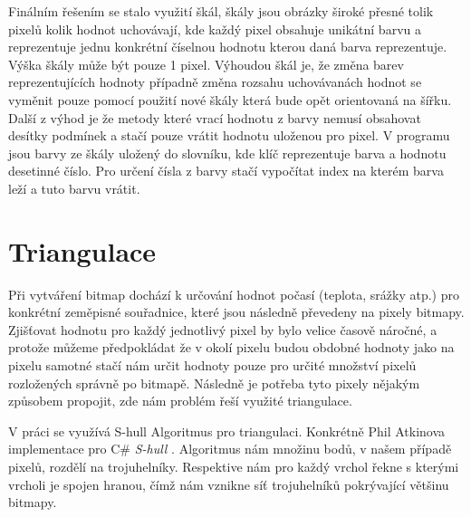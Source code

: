 \documentclass[czech,bachelor,dept460,male,csharp,cpdeclaration]{diploma}
\begin{document}
	Finálním řešením se stalo využití škál, škály jsou obrázky široké přesné tolik pixelů kolik hodnot uchovávají, kde každý pixel obsahuje unikátní barvu a reprezentuje jednu konkrétní číselnou hodnotu kterou daná barva reprezentuje. Výška škály může být pouze 1 pixel. Výhoudou škál je, že změna barev reprezentujících hodnoty případně změna rozsahu uchovávanách hodnot se vyměnit pouze pomocí použití nové škály která bude opět orientovaná na šířku. Další z výhod je že metody které vrací hodnotu z barvy nemusí obsahovat desítky podmínek a stačí pouze vrátit hodnotu uloženou pro pixel. V programu jsou barvy ze škály uložený do slovníku, kde klíč reprezentuje barva a hodnotu desetinné číslo. Pro určení čísla z barvy stačí vypočítat index na kterém barva leží a tuto barvu vrátit.
	
	\section{Triangulace}
	
	Při vytváření bitmap dochází k určování hodnot počasí (teplota, srážky atp.) pro konkrétní zeměpisné souřadnice, které jsou následně převedeny na pixely bitmapy. Zjišťovat hodnotu pro každý jednotlivý pixel by bylo velice časově náročné, a protože můžeme předpokládat že v okolí pixelu budou obdobné hodnoty jako na pixelu samotné stačí nám určit hodnoty pouze pro určité množství pixelů rozložených správně po bitmapě. Následně je potřeba tyto pixely nějakým způsobem propojit, zde nám problém řeší využité triangulace.
	
	V práci se využívá S-hull Algoritmus pro triangulaci. Konkrétně Phil Atkinova implementace pro C\# \emph{S-hull} \cite{shull}. Algoritmus nám množinu bodů, v našem případě pixelů, rozdělí na trojuhelníky. Respektive nám pro každý vrchol řekne s kterými vrcholi je spojen hranou, čímž nám vznikne síť trojuhelníků pokrývající většinu bitmapy.
	
	
\end{document}

